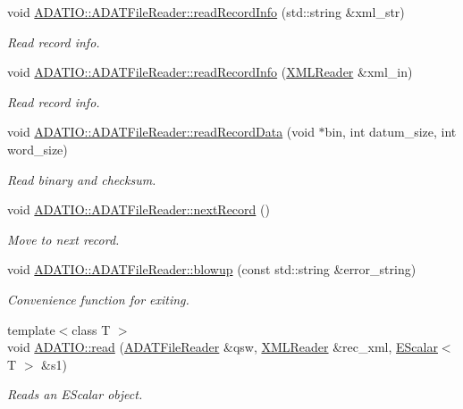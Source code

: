 \begin{DoxyCompactItemize}
void \mbox{\hyperlink{group__qio_gade5b9d659e34ec9c9de267858a675d7d}{A\+D\+A\+T\+I\+O\+::\+A\+D\+A\+T\+File\+Reader\+::read\+Record\+Info}} (std\+::string \&xml\+\_\+str)
\begin{DoxyCompactList}\small\item\em Read record info. \end{DoxyCompactList}\item 
void \mbox{\hyperlink{group__qio_ga4d771a46d7db77cd0ae5999113733795}{A\+D\+A\+T\+I\+O\+::\+A\+D\+A\+T\+File\+Reader\+::read\+Record\+Info}} (\mbox{\hyperlink{classADATXML_1_1XMLReader}{X\+M\+L\+Reader}} \&xml\+\_\+in)
\begin{DoxyCompactList}\small\item\em Read record info. \end{DoxyCompactList}\item 
void \mbox{\hyperlink{group__qio_ga525c9902a7ee7ebe41c688897da0652e}{A\+D\+A\+T\+I\+O\+::\+A\+D\+A\+T\+File\+Reader\+::read\+Record\+Data}} (void $\ast$bin, int datum\+\_\+size, int word\+\_\+size)
\begin{DoxyCompactList}\small\item\em Read binary and checksum. \end{DoxyCompactList}\item 
void \mbox{\hyperlink{group__qio_ga032651053fa6b2de6d3977f15862c48e}{A\+D\+A\+T\+I\+O\+::\+A\+D\+A\+T\+File\+Reader\+::next\+Record}} ()
\begin{DoxyCompactList}\small\item\em Move to next record. \end{DoxyCompactList}\item 
void \mbox{\hyperlink{group__qio_gaddf83cb612ce869fe7a0a5f7e559fe72}{A\+D\+A\+T\+I\+O\+::\+A\+D\+A\+T\+File\+Reader\+::blowup}} (const std\+::string \&error\+\_\+string)
\begin{DoxyCompactList}\small\item\em Convenience function for exiting. \end{DoxyCompactList}\item 
{\footnotesize template$<$class T $>$ }\\void \mbox{\hyperlink{group__qio_ga3dd8ea4aebc2b69c0ad2996743816341}{A\+D\+A\+T\+I\+O\+::read}} (\mbox{\hyperlink{classADATIO_1_1ADATFileReader}{A\+D\+A\+T\+File\+Reader}} \&qsw, \mbox{\hyperlink{classADATXML_1_1XMLReader}{X\+M\+L\+Reader}} \&rec\+\_\+xml, \mbox{\hyperlink{classENSEM_1_1EScalar}{E\+Scalar}}$<$ T $>$ \&s1)
\begin{DoxyCompactList}\small\item\em Reads an E\+Scalar object. \end{DoxyCompactList}\item 

\end{DoxyCompactItemize}
